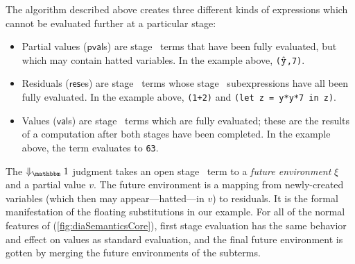 

\newcommand{\pval}{\ensuremath{\mathsf{pval}}}
\newcommand{\res}{\ensuremath{\mathsf{res}}}
\renewcommand{\val}{\ensuremath{\mathsf{val}}}

The algorithm described above creates three different kinds of expressions which
cannot be evaluated further at a particular stage:
\begin{itemize}
\item 
Partial values ($\pval$s) are stage \bbone\ terms that have been fully evaluated, 
but which may contain hatted variables. In the example above, 
\verb|(|$\hat {\tt y}$\verb|,7)|.
\item Residuals ($\res$es) are stage \bbtwo\ terms whose stage \bbone\
subexpressions have all been fully evaluated. In the example above,
\verb|(1+2)| and \verb|(let z = y*y*7 in z)|.
\item Values ($\val$s) are stage \bbtwo\ terms which are fully evaluated; these
are the results of a computation after both stages have been completed. In the
example above, the term evaluates to \verb|63|.
\end{itemize}
The $\redonesym$ judgment takes an open stage \bbone\ term to a {\em future environment} $\xi$ and a partial value $v$.
The future environment is a mapping from newly-created variables 
(which then may appear---hatted---in $v$)
to residuals.  It is the formal manifestation of the floating substitutions in our example.
For all of the normal features of \lang (\ref{fig:diaSemanticsCore}), first stage evaluation has the same behavior and effect on values as standard evaluation,
and the final future environment is gotten by merging the future environments of the subterms.

